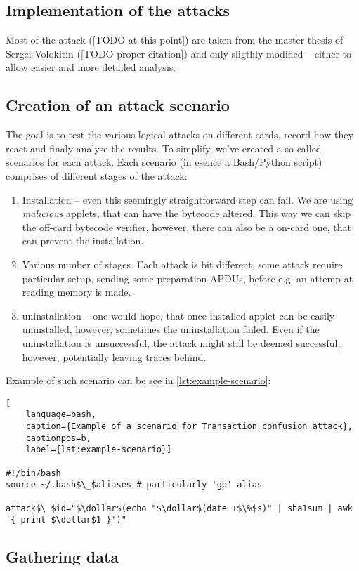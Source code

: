 \documentclass[a4paper]{scrartcl}
\newcommand{\dollar}{\mbox{\textdollar}}
\begin{document}
\subsection{Implementation of the attacks}

Most of the attack ([TODO at this point]) are taken from the master thesis of Sergei Volokitin ([TODO proper citation]) and only sligthly modified -- either to allow easier and more detailed analysis.
\subsection{Creation of an attack scenario}

The goal is to test the various logical attacks on different cards, record how they react and finaly analyse the results. To simplify, we've created a so called scenarios for each attack. Each scenario (in esence a Bash/Python script) comprises of different stages of the attack:
\begin{enumerate}
    \item Installation -- even this seemingly straightforward step can fail. We are using \textit{malicious} applets, that can have the bytecode altered. This way we can skip the off-card bytecode verifier, however, there can also be a on-card one, that can prevent the installation.
    \item Various number of stages. Each attack is bit different, some attack require particular setup, sending some preparation APDUs, before e.g. an attemp at reading memory is made.
    \item uninstallation -- one would hope, that once installed applet can be easily uninstalled, however, sometimes the uninstallation failed. Even if the uninstallation is unsuccessful, the attack might still be deemed successful, however, potentially leaving traces behind.
\end{enumerate}

Example of such scenario can be see in \ref{lst:example-scenario}:
\begin{lstlisting}[
    language=bash,
    caption={Example of a scenario for Transaction confusion attack},
    captionpos=b,
    label={lst:example-scenario}]

#!/bin/bash
source ~/.bash$\_$aliases # particularly 'gp' alias

attack$\_$id="$\dollar$(echo "$\dollar$(date +$\%$s)" | sha1sum | awk '{ print $\dollar$1 }')"
\end{lstlisting}

\subsection{Gathering data}
\end{document}
